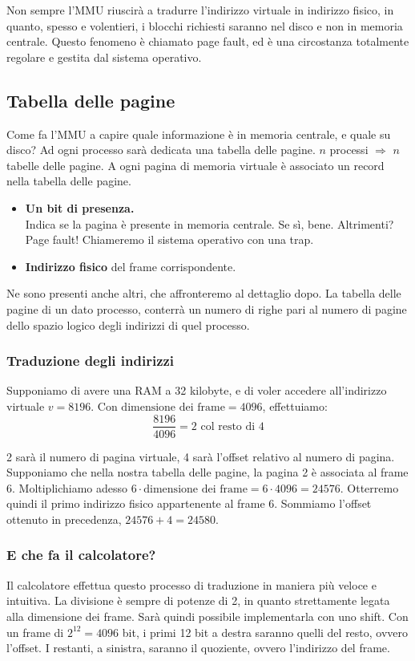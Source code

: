 \documentclass{report}
\begin{document}
Non sempre l'MMU riuscirà a tradurre l'indirizzo virtuale in indirizzo fisico, in quanto, spesso e volentieri, i blocchi richiesti saranno nel disco e non in memoria centrale. 
Questo fenomeno è chiamato page fault, ed è una circostanza totalmente regolare e gestita dal sistema operativo.

\subsection{Tabella delle pagine}
Come fa l'MMU a capire quale informazione è in memoria centrale, e quale su disco? Ad ogni processo sarà dedicata una tabella delle pagine. $n$ processi $\Rightarrow$ $n$ tabelle delle pagine. A ogni pagina di memoria virtuale è associato un record nella tabella delle pagine.

\begin{itemize}
    \item \textbf{Un bit di presenza.}\\
    Indica se la pagina è presente in memoria centrale. Se sì, bene. Altrimenti? Page fault! Chiameremo il sistema operativo con una trap.
    \item \textbf{Indirizzo fisico} del frame corrispondente.
\end{itemize}

Ne sono presenti anche altri, che affronteremo al dettaglio dopo.
La tabella delle pagine di un dato processo, conterrà un numero di righe pari al numero di pagine dello spazio logico degli indirizzi di quel processo.

\subsubsection{Traduzione degli indirizzi}

Supponiamo di avere una RAM a 32 kilobyte, e di voler accedere all'indirizzo virtuale $v = 8196$. Con $\text{dimensione dei frame} = 4096$, effettuiamo:
$$
\frac{8196}{4096} = 2 \text{ col resto di }4
$$

2 sarà il numero di pagina virtuale, 4 sarà l'offset relativo al numero di pagina.
Supponiamo che nella nostra tabella delle pagine, la pagina 2 è associata al frame 6. Moltiplichiamo adesso $6 \cdot \text{dimensione dei frame} = 6 \cdot 4096 = 24576$. Otterremo quindi il primo indirizzo fisico appartenente al frame 6. Sommiamo l'offset ottenuto in precedenza, $24576 + 4 = 24580$.

\subsubsection{E che fa il calcolatore?}
Il calcolatore effettua questo processo di traduzione in maniera più veloce e intuitiva. La divisione è sempre di potenze di 2, in quanto strettamente legata alla dimensione dei frame. Sarà quindi possibile implementarla con uno shift. Con un frame di $2^{12}=4096$ bit, i primi 12 bit a destra saranno quelli del resto, ovvero l'offset. I restanti, a sinistra, saranno il quoziente, ovvero l'indirizzo del frame.
\end{document}
